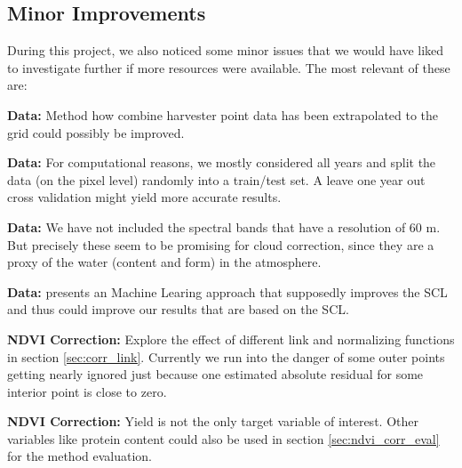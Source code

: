 {    \subsection{Minor Improvements}
        During this project, we also noticed some minor issues that we would have liked to investigate further if more resources were available. The most relevant of these are:
        \begin{Nitemize}
            \item \textbf{Data:}
            Method how combine harvester point data has been extrapolated to the grid could possibly be improved.
            \item \textbf{Data:}
            For computational reasons, we mostly considered all years and split the data (on the pixel level) randomly into a train/test set. A leave one year out cross validation might yield more accurate results.
            \item \textbf{Data:}
            We have not included the spectral bands that have a resolution of 60 m. But precisely these seem to be promising for cloud correction, since they are a proxy of the water (content and form) in the atmosphere.
            \item \textbf{Data:}
            \cite{raiyaniSentinel2ImageScene2021} presents an Machine Learing approach that supposedly improves the SCL and thus could improve our results that are based on the SCL.
            \item \textbf{NDVI Correction:}
            Explore the effect of different link and normalizing functions %
            in section \ref{sec:corr_link}. Currently we run into the danger of some outer points getting nearly ignored just because one estimated absolute residual for some interior point is close to zero.
            \item \textbf{NDVI Correction:}
            Yield is not the only target variable of interest. Other variables like protein content could also be used in section \ref{sec:ndvi_corr_eval} for the method evaluation. 
        \end{Nitemize}
}


